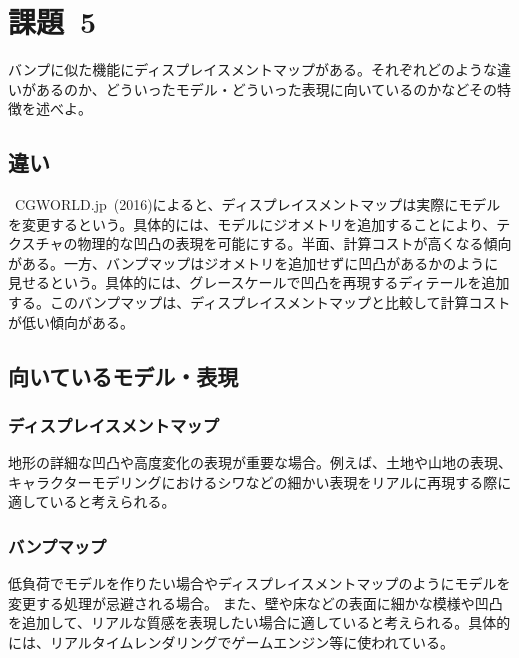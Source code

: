 \documentclass[a4j]{jarticle}
\begin{document}
\newpage
\section{課題\ 5}
%
バンプに似た機能にディスプレイスメントマップがある。それぞれどのような違いがあるのか、どういったモデル・どういった表現に向いているのかなどその特徴を述べよ。
%
\subsection{違い}
%
\ CGWORLD.jp\ (2016)によると、ディスプレイスメントマップは実際にモデルを変更するという\cite{cgworld}。具体的には、モデルにジオメトリを追加することにより、テクスチャの物理的な凹凸の表現を可能にする。半面、計算コストが高くなる傾向がある。一方、バンプマップはジオメトリを追加せずに凹凸があるかのように見せるという\cite{cgworld}。具体的には、グレースケールで凹凸を再現するディテールを追加する。このバンプマップは、ディスプレイスメントマップと比較して計算コストが低い傾向がある。
%
\subsection{向いているモデル・表現}
%
\subsubsection{ディスプレイスメントマップ}
%
地形の詳細な凹凸や高度変化の表現が重要な場合。例えば、土地や山地の表現、キャラクターモデリングにおけるシワなどの細かい表現をリアルに再現する際に適していると考えられる。
%
\subsubsection{バンプマップ}
%
低負荷でモデルを作りたい場合やディスプレイスメントマップのようにモデルを変更する処理が忌避される場合。 また、壁や床などの表面に細かな模様や凹凸を追加して、リアルな質感を表現したい場合に適していると考えられる。具体的には、リアルタイムレンダリングでゲームエンジン等に使われている。
%
\end{document}
